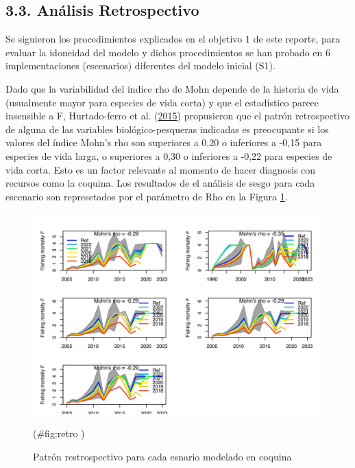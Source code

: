\documentclass[
]{article}
\begin{document}
\hypertarget{anuxe1lisis-retrospectivo}{%
\subsection{3.3. Análisis Retrospectivo}\label{anuxe1lisis-retrospectivo}}

Se siguieron los procedimientos explicados en el objetivo 1 de este reporte, para evaluar la idoneidad
del modelo y dichos procedimientos se han probado en 6 implementaciones (escenarios) diferentes del
modelo inicial (S1).

Dado que la variabilidad del índice rho de Mohn depende de la historia de vida (usualmente
mayor para especies de vida corta) y que el estadístico parece insensible a F, Hurtado-ferro et al. (\protect\hyperlink{ref-Hurtado2014}{2015})
propusieron que el patrón retrospectivo de alguna de las variables biológico-pesqueras indicadas es
preocupante si los valores del índice Mohn's rho son superiores a 0,20 o inferiores a -0,15 para especies
de vida larga, o superiores a 0,30 o inferiores a -0,22 para especies de vida corta. Esto es un factor relevante al momento de hacer diagnosis con recursos como la coquina. Los resultados de el análisis de sesgo para cada escenario son represetados por el parámetro de Rho en la Figura \ref{fig:retro}.

\begin{figure}[H]

{\centering \includegraphics{Dtrunculus_SS3_2024_files/figure-latex/retro -1} 

}

\caption{\label{fig:retro}Patrón restrospectivo para cada esnario modelado en coquina}(\#fig:retro )
\end{figure}
\end{document}
